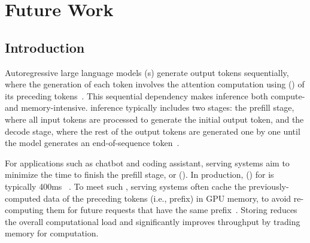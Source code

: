 \chapter{Future Work}
\label{chap:future}

\section{Introduction}
Autoregressive large language models (\llm{}s) generate output tokens sequentially, where the generation of each token involves the attention computation using \kvfull (\kv) of its preceding tokens~\cite{gpt1, gpt2, gpt3}. 
This sequential dependency makes \llm inference both compute- and memory-intensive.
\llm inference typically includes two stages: the prefill stage, where all input tokens are processed to generate the initial output token, and the decode stage, where the rest of the output tokens are generated one by one until the model generates an end-of-sequence token~\cite{agrawal2023sarathi,distserve,patel2024splitwise}. 


For applications such as chatbot and coding assistant, \llm serving systems aim to minimize the time to finish the prefill stage, or \ttftfull (\ttft).
In production, \slofull (\slo) for \ttft is typically 400ms ~\cite{distserve}.
To meet such \slo, \llm serving systems often cache the previously-computed \kv data of the preceding tokens (i.e., prefix) in GPU memory, to avoid re-computing them for future requests that have the same prefix~\cite{pagedattenion, distserve, memserve}. 
Storing \kvcache reduces the overall computational load and significantly improves throughput by trading memory for computation. 


